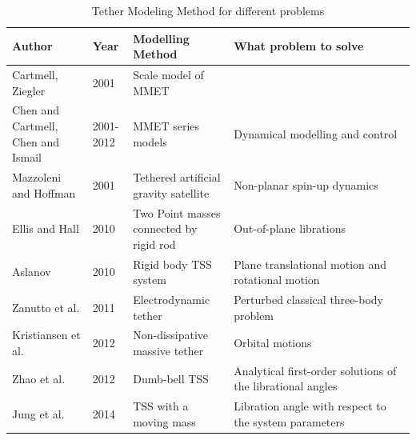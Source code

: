 \begin{table}[h!]
\renewcommand\arraystretch{2}
	\begin{center}
	\caption{Tether Modeling Method for different problems\cite{chen2013history}}
	\begin{tabular}{p{0.2\linewidth}|p{0.1\linewidth}|p{0.25\linewidth}|p{0.45\linewidth}}
	\toprule
	\textbf{Author} & \textbf{Year} & \textbf{Modelling Method} & \textbf{What problem to solve}\\
	\midrule
	Cartmell, Ziegler & 2001 & Scale model of MMET & \\
	Chen and Cartmell, Chen and Ismail & 2001-2012 & MMET series models & Dynamical modelling and control\\
	Mazzoleni and Hoffman & 2001 & Tethered artificial gravity satellite & Non-planar spin-up dynamics\\
	Ellis and Hall&	2010&	Two Point masses connected by rigid rod & Out-of-plane librations\\
	Aslanov &	2010&	Rigid body TSS system	& Plane translational motion and rotational motion\\
	Zanutto et al.& 2011 & Electrodynamic tether & Perturbed classical three-body problem\\
	Kristiansen et al.&	2012 &	Non-dissipative massive tether & Orbital motions\\
	Zhao et al.	&2012&	Dumb-bell TSS & Analytical first-order solutions of the librational angles\\
	Jung et al. & 2014 &	TSS with a moving mass & Libration angle with respect to the system parameters\\
	\bottomrule
	\end{tabular}	
	\end{center}
\end{table}



\newpage
